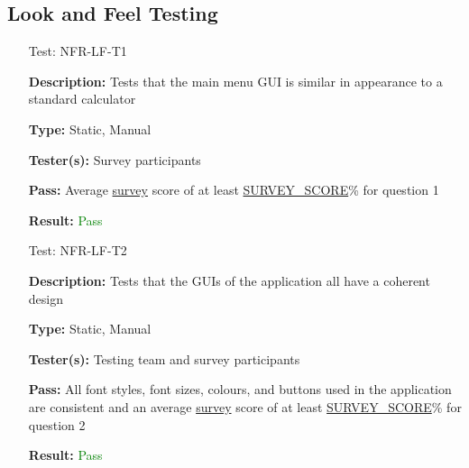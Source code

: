 \documentclass[12pt, titlepage]{article}
\begin{document}
\subsection{Look and Feel Testing}
\begin{enumerate}

\item[Test:]{NFR-LF-T1\\}

\textbf{Description:} Tests that the main menu GUI is similar in appearance to a standard calculator

\textbf{Type:} Static, Manual
					
\textbf{Tester(s):} Survey participants
					
\textbf{Pass:} Average \hyperref[sec:surveyR]{survey} score of at least \hyperref[sec:sp]{SURVEY\_SCORE}\% for question 1
					
\textbf{Result:} \textcolor{Green}{Pass}

\item[Test:]{NFR-LF-T2\\}

\textbf{Description:} Tests that the GUIs of the application all have a coherent design

\textbf{Type:} Static, Manual
					
\textbf{Tester(s):} Testing team and survey participants
					
\textbf{Pass:} All font styles, font sizes, colours, and buttons used in the application are consistent and an average \hyperref[sec:surveyR]{survey} score of at least \hyperref[sec:sp]{SURVEY\_SCORE}\% for question 2
					
\textbf{Result:} \textcolor{Green}{Pass}

\end{enumerate}

		
\end{document}
